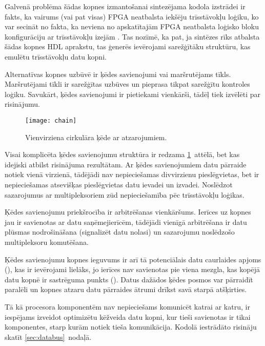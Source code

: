 	Galvenā problēma šādas kopnes izmantošanai sintezējama kodola izstrādei ir
	fakts, ka vairums (vai pat visas) FPGA neatbalsta iekšēju trīsstāvokļu
	loģiku, ko var secināt no fakta, ka neviena no apskatītajām FPGA neatbalsta
	loģisko bloku konfigurāciju ar trīsstāvokļu izejām
	\cite[18.~lpp.]{FusionFAQ}\cite{SmartFusionFabric}\cite{Xilinx7}.
	Tas nozīmē, ka pat, ja sintēzes rīks atbalsta šādas kopnes HDL aprakstu, tas
	ģenerēs ievērojami sarežģītāku struktūru, kas emulētu trīsstāvokļu datu kopni.

	Alternatīvas kopnes uzbūvē ir ķēdes savienojumi vai maršrutējams tīkls.
	Maršrutējami tīkli ir sarežģītas uzbūves un pieprasa tikpat sarežģītu
	kontroles loģiku. Savukārt, ķēdes savienojumi ir pietiekami vienkārši,
	tādēļ tiek izvēlēti par risinājumu.

	\begin{figure}[thb]
		\centering
		\texttt{[image: chain]}
		\caption{Vienvirziena cirkulāra ķēde ar atzarojumiem.}
		\label{fig:chain}
	\end{figure}

	Visai komplicēta ķēdes savienojumu struktūra ir redzama \ref{fig:chain}~attēlā,
	bet kas idejiski atbilst risinājuma rezultātam. 
	Ar ķēdes savienojumiem datu pārraide notiek vienā virzienā,
	tādējādi nav nepieciešamas divvirzienu pieslēgvietas, bet ir nepieciešamas
	atsevišķas pieslēgvietas datu ievadei un izvadei. Noslēdzot sazarojumus ar
	multipleksoriem zūd nepieciešamība pēc trīsstāvokļu loģikas.

	Ķēdes savienojumu priekšrocība ir arbitrēšanas vienkāršums. Ierīces uz kopnes
	jau ir savienotas ar datu saņēmejierīcēm, tādējādi vienīgā arbitrēšana ir
	datu plūsmas nodrošināšana (signalizēt datu nolasi) un sazarojumu noslēdzošo
	multipleksoru komutēšana.
	
	Ķēdes savienojumu kopnes ieguvums ir arī tā potenciālais datu caurlaides
	apjoms (), kas ir ievērojami lielāks, jo ierīces nav
	savienotas pie viena mezgla, kas kopējā datu kopnē ir sastrēguma punkts
	(). Datus dažādos ķēdes posmos var pārraidīt
	paralēli un kopnes atzaru datu pārraides ātrumi drīkst savā starpā 
	atšķirties.

	Tā kā procesora komponentēm nav nepieciešams komunicēt katrai ar katru, ir
	iespējams izveidot optimizētu kēžveida datu kopni, kur tieši savienotas ir tikai
	komponentes, starp kurām notiek tieša komunikācija. Kodolā iestrādāto
	risināju skatīt \ref{sec:databus}~nodaļā.

\pagebreak[3]

